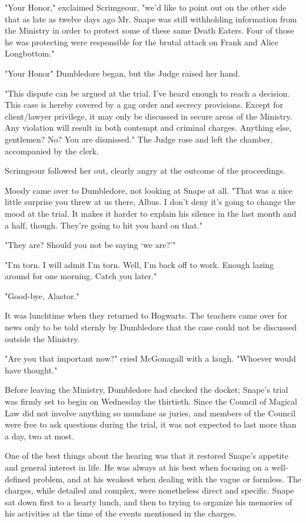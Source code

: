 "Your Honor," exclaimed Scrimgeour, "we'd like to point out on the other side that as late as twelve days ago Mr. Snape was still withholding information from the Ministry in order to protect some of these same Death Eaters. Four of those he was protecting were responsible for the brutal attack on Frank and Alice Longbottom."

"Your Honor{\el}" Dumbledore began, but the Judge raised her hand.

"This dispute can be argued at the trial. I've heard enough to reach a decision. This case is hereby covered by a gag order and secrecy provisions. Except for client\slash lawyer privilege, it may only be discussed in secure areas of the Ministry. Any violation will result in both contempt and criminal charges. Anything else, gentlemen? No? You are dismissed." The Judge rose and left the chamber, accompanied by the clerk.

Scrimgeour followed her out, clearly angry at the outcome of the proceedings.

Moody came over to Dumbledore, not looking at Snape at all. "That was a nice little surprise you threw at us there, Albus. I don't deny it's going to change the mood at the trial. It makes it harder to explain his silence in the last month and a half, though. They're going to hit you hard on that."

"They are? Should you not be saying `we are?'"

"I'm torn. I will admit I'm torn. Well, I'm back off to work. Enough lazing around for one morning. Catch you later."

"Good-bye, Alastor."

It was lunchtime when they returned to Hogwarts. The teachers came over for news only to be told sternly by Dumbledore that the case could not be discussed outside the Ministry.

"Are you that important now?" cried McGonagall with a laugh. "Whoever would have thought."

Before leaving the Ministry, Dumbledore had checked the docket; Snape's trial was firmly set to begin on Wednesday the thirtieth. Since the Council of Magical Law did not involve anything so mundane as juries, and members of the Council were free to ask questions during the trial, it was not expected to last more than a day, two at most.

One of the best things about the hearing was that it restored Snape's appetite and general interest in life. He was always at his best when focusing on a well-defined problem, and at his weakest when dealing with the vague or formless. The charges, while detailed and complex, were nonetheless direct and specific. Snape sat down first to a hearty lunch, and then to trying to organize his memories of his activities at the time of the events mentioned in the charges.

